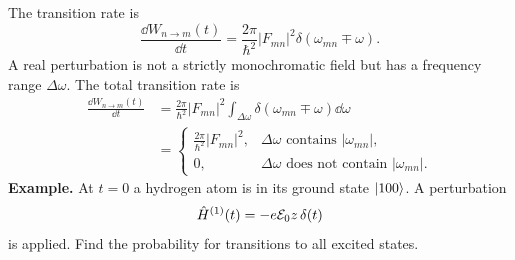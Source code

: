 The transition rate is
\begin{equation}
 \frac{\dd W_{n\to m}(t)}{\dd t}
 =\frac{2\pi}{\hbar^2}|F_{mn}|^2\delta(\omega_{mn}\mp\omega).
\end{equation}
A real perturbation is not a strictly monochromatic field but has a frequency range $\Delta\omega$. The total transition rate is
\begin{equation}\begin{aligned}
 \frac{\dd W_{n\to m}(t)}{\dd t}
 &=\frac{2\pi}{\hbar^2}|F_{mn}|^2
 \int_{\Delta\omega}\delta(\omega_{mn}\mp\omega)\dd\omega\\
 &=\begin{cases}
 \displaystyle\frac{2\pi}{\hbar^2}|F_{mn}|^2,
 &\Delta\omega\text{ contains }|\omega_{mn}|,\\
 0,&\Delta\omega\text{ does not contain }|\omega_{mn}|.
 \end{cases}
\end{aligned}\end{equation}
\textbf{Example.} At $t=0$ a hydrogen atom is in its ground state $\left|100\right\rangle$. A perturbation
\begin{equation}
 \hat{H}^{(1)}(t)=-e\mathcal E_0 z\,\delta(t)
\end{equation}
is applied. Find the probability for transitions to all excited states.

